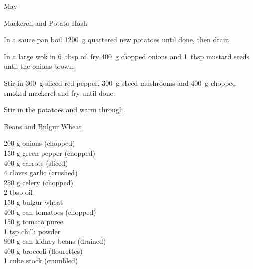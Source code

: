 \begin{menu}{May}
\begin{recipe}{2}{Mackerell and Potato Hash}
\begin{ingredients}
		\end{ingredients}
	
	
    \begin{instructions}
    \item 
        In a sauce pan boil
        1200~g quartered new potatoes
        until done,
        then drain.
      \item 
        In a large wok in
        6~tbsp  oil
        fry
        400~g chopped onions
        and
        1~tbsp  mustard seeds
        until the onions brown.
      \item 
        Stir in
        300~g sliced red pepper,
        300~g sliced mushrooms
        and
        400~g chopped smoked mackerel
        and fry until done.
      \item 
        Stir in the potatoes
        and warm through.
      
    \end{instructions}
    \end{recipe}%
  
    \begin{recipe}{2}{Beans and Bulgur Wheat}%
		\begin{ingredients}
		200 g onions (chopped) \\
	150 g green pepper (chopped) \\
	400 g carrots (sliced) \\
	4 cloves garlic (crushed) \\
	250 g celery (chopped) \\
	2 tbsp oil  \\
	150 g bulgur wheat  \\
	400 g can tomatoes (chopped) \\
	150 g tomato puree  \\
	1 tsp chilli powder  \\
	800 g can kidney beans (drained) \\
	400 g broccoli (flourettes) \\
	1 cube stock (crumbled) \\
	
		\end{ingredients}
	
	

\end{recipe}
\end{menu}
